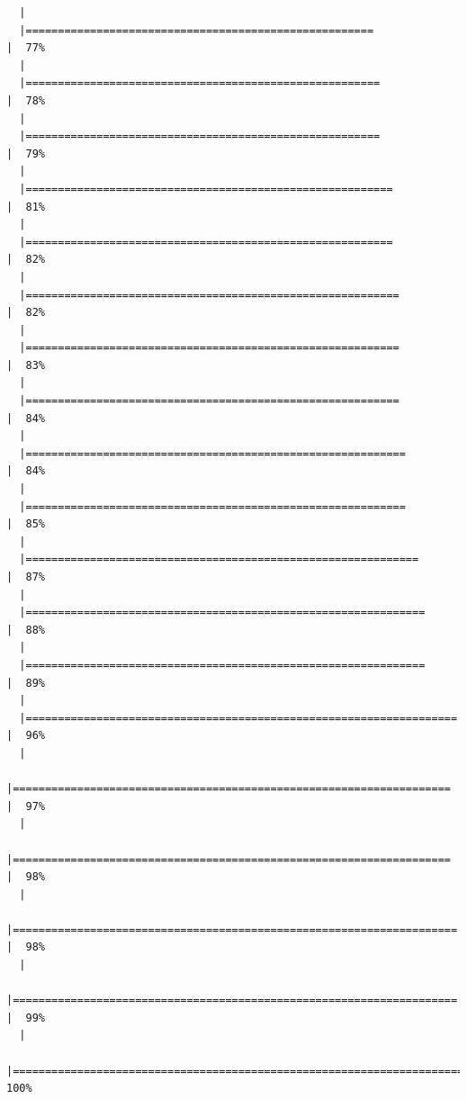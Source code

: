 \documentclass[
  letterpaper,
  DIV=11,
  numbers=noendperiod]{scrreprt}
\begin{document}
\begin{verbatim}
  |                                                                            
  |======================================================                |  77%
  |                                                                            
  |=======================================================               |  78%
  |                                                                            
  |=======================================================               |  79%
  |                                                                            
  |=========================================================             |  81%
  |                                                                            
  |=========================================================             |  82%
  |                                                                            
  |==========================================================            |  82%
  |                                                                            
  |==========================================================            |  83%
  |                                                                            
  |==========================================================            |  84%
  |                                                                            
  |===========================================================           |  84%
  |                                                                            
  |===========================================================           |  85%
  |                                                                            
  |=============================================================         |  87%
  |                                                                            
  |==============================================================        |  88%
  |                                                                            
  |==============================================================        |  89%
  |                                                                            
  |===================================================================   |  96%
  |                                                                            
  |====================================================================  |  97%
  |                                                                            
  |====================================================================  |  98%
  |                                                                            
  |===================================================================== |  98%
  |                                                                            
  |===================================================================== |  99%
  |                                                                            
  |======================================================================| 100%
\end{verbatim}
\end{document}

